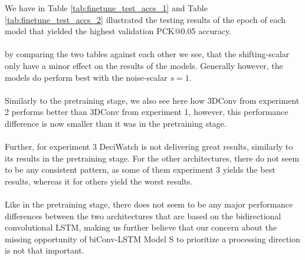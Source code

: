 \documentclass[./main.tex]{subfiles}
\begin{document}
\noindent We have in Table \ref{tab:finetune_test_accs_1} and Table \ref{tab:finetune_test_accs_2} illustrated the testing results of the epoch of each model that yielded the highest validation PCK@0.05 accuracy.
\\
\\
by comparing the two tables against each other we see, that the shifting-scalar only have a minor effect on the results of the models. Generally however, the models do perform best with the noise-scalar $s = 1$.
\\
\\
Similarly to the pretraining stage, we also see here how 3DConv from experiment 2 performs better than 3DConv from experiment 1, however, this performance difference is now smaller than it was in the pretraining stage.
\\
\\
Further, for experiment 3 DeciWatch is not delivering great results, similarly to its results in the pretraining stage. For the other architectures, there do not seem to be any consistent pattern, as some of them experiment 3 yields the best results, whereas it for others yield the worst results.
\\
\\
Like in the pretraining stage, there does not seem to be any major performance differences between the two architectures that are based on the bidirectional convolutional LSTM, making us further believe that our concern about the missing opportunity of biConv-LSTM Model S to prioritize a processing direction is not that important.
\end{document}
